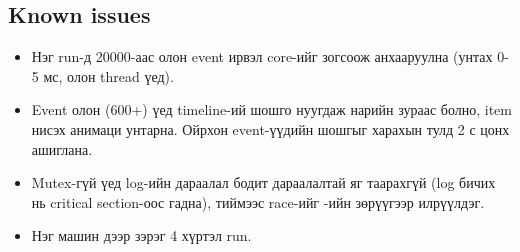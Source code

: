 \documentclass[12pt,a4paper]{article}
\begin{document}
\subsection{Known issues}
\begin{itemize}
  \item Нэг run-д 20000-аас олон event ирвэл core-ийг зогсоож анхааруулна (унтах 0-5 мс, олон thread үед).
  \item Event олон (600+) үед timeline-ий шошго нуугдаж нарийн зураас болно, item нисэх анимаци унтарна. Ойрхон event-үүдийн шошгыг харахын тулд 2 с цонх ашиглана.
  \item Mutex-гүй үед log-ийн дараалал бодит дараалалтай яг таарахгүй (log бичих нь critical section-оос гадна), тиймээс race-ийг -ийн зөрүүгээр илрүүлдэг.
  \item Нэг машин дээр зэрэг 4 хүртэл run.
\end{itemize}
\end{document}
